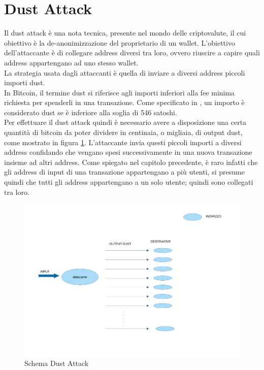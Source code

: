 \section{Dust Attack}
Il dust attack è una nota tecnica, presente nel mondo delle criptovalute, il cui obiettivo è la 
de-anonimizzazione del proprietario di un wallet. L'obiettivo dell'attaccante è di collegare address diversi tra loro, ovvero riuscire a capire quali address appartengano ad uno stesso wallet.\\
La strategia usata dagli attaccanti è quella di inviare a diversi address piccoli importi dust.\\
In Bitcoin, il termine dust si riferisce agli importi inferiori alla fee minima richiesta per spenderli in una transazione. Come specificato in \cite{BtcDev}, un
importo è considerato dust se è inferiore alla soglia di 546 satoshi.\\
Per effettuare il dust attack quindi è necessario avere a disposizione una certa quantità di bitcoin da poter dividere in centinaia, o migliaia, di output dust, come mostrato in figura \ref{fig:Dust_attack}.
L'attaccante invia questi piccoli importi a diversi address confidando che vengano spesi successivamente in una nuova transazione insieme ad altri address. Come spiegato nel capitolo precedente, è raro infatti che gli address di input di una transazione appartengano a più utenti, si presume quindi che tutti gli address appartengano a un solo utente; quindi sono collegati tra loro.
\begin{figure}[h!]
    \centering
    \includegraphics[scale=0.5]{Images/dust_attack.pdf}
    \caption{Schema Dust Attack}
    \label{fig:Dust_attack}
\end{figure}
